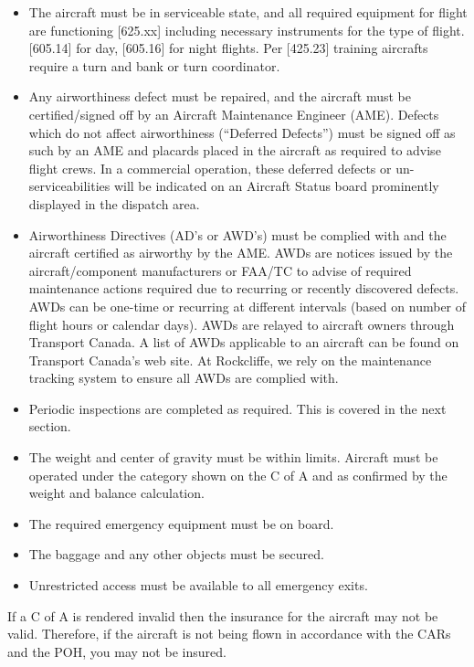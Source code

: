 \documentclass[12pt,letterpaper]{article}
\begin{document}
    \begin{itemize}
        \item The aircraft must be in serviceable state, and all required equipment for flight are functioning [625.xx] including necessary instruments for the type of flight. [605.14] for day, [605.16] for night flights. Per [425.23] training aircrafts require a turn and bank or turn coordinator.
        \item Any airworthiness defect must be repaired, and the aircraft must be certified/signed off by an Aircraft Maintenance Engineer (AME). Defects which do not affect airworthiness (“Deferred Defects”) must be signed off as such by an AME and placards placed in the aircraft as required to advise flight crews. In a commercial operation, these deferred defects or un-serviceabilities will be indicated on an Aircraft Status board prominently displayed in the dispatch area.
        \item Airworthiness Directives (AD's or AWD's) must be complied with and the aircraft certified as airworthy by the AME. AWDs are notices issued by the aircraft/component manufacturers or FAA/TC to advise of required maintenance actions required due to recurring or recently discovered defects. AWDs can be one-time or recurring at different intervals (based on number of flight hours or calendar days). AWDs are relayed to aircraft owners through Transport Canada. A list of AWDs applicable to an aircraft can be found on Transport Canada’s web site. At Rockcliffe, we rely on the maintenance tracking system to ensure all AWDs are complied with. 
        \item Periodic inspections are completed as required. This is covered in the next section.
        \item The weight and center of gravity must be within limits. Aircraft must be operated under the category shown on the C of A and as confirmed by the weight and balance calculation.
        \item The required emergency equipment must be on board. 
        \item The baggage and any other objects must be secured.
        \item Unrestricted access must be available to all emergency exits.
    \end{itemize}

    If a C of A is rendered invalid then the insurance for the aircraft may not be valid. Therefore, if the aircraft is not being flown in accordance with the CARs and the POH, you may not be insured.
\end{document}
